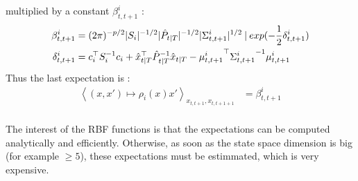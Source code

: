 multiplied by a constant $\beta^{i}_{t,t+1}$ :
\begin{align*}
  \beta^i_{t,t+1} &= (2\pi)^{-p/2} |S_i|^{-1/2} |\hat{P}_{t|T}|^{-1/2} |\Sigma^i_{t,t+1}|^{1/2}\mathbin{\vert} exp(-\frac{1}{2} \delta^i_{t,t+1})\\
  \delta^i_{t,t+1} &= c_i^{\top} S_i^{-1} c_i + \hat{x}_{t \mathbin{\vert} T}^{\top} \hat{P}_{t \mathbin{\vert} T}^{-1} \hat{x}_{t \mathbin{\vert} T} - {\mu^i_{t,t+1}}^{\top} {\Sigma^i_{t,t+1}}^{-1} \mu^i_{t,t+1}\\
\end{align*}
Thus the last expectation is :
\begin{align*}
  \left< (x,x') \mapsto \rho_i(x) x' \right>_{x_{t,t+1},x_{t,t+1+1}} &= \beta^i_{t,t+1}\\
\end{align*}

The interest of the RBF functions is that the expectations can be computed analytically and efficiently.
Otherwise, as soon as the state space dimension is big (for example $\geq 5$), these expectations must be estimmated, which is very expensive.
